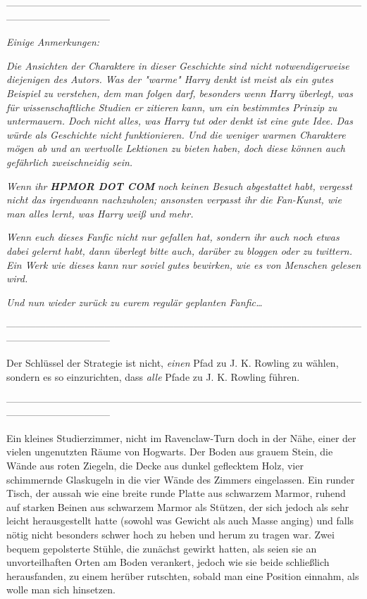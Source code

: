 {--------------------------------------------------------------------------------------------------------------------------------------------

\emph{\emph{Einige Anmerkungen:}}

\emph{Die Ansichten der Charaktere in dieser Geschichte sind nicht notwendigerweise diejenigen des Autors. Was der "warme" Harry denkt ist} \emph{\emph{meist}} \emph{als ein gutes Beispiel zu verstehen, dem man folgen darf, besonders wenn Harry überlegt, was für wissenschaftliche Studien er zitieren kann, um ein bestimmtes Prinzip zu untermauern. Doch nicht alles, was Harry tut oder denkt ist eine gute Idee. Das würde als Geschichte nicht funktionieren. Und die weniger warmen Charaktere mögen ab und an wertvolle Lektionen zu bieten haben, doch diese können auch gefährlich zweischneidig sein.}

\emph{Wenn ihr} \emph{\textbf{HPMOR DOT COM}} \emph{noch keinen Besuch abgestattet habt, vergesst nicht das irgendwann nachzuholen; ansonsten verpasst ihr die Fan-Kunst, wie man alles lernt, was Harry weiß und mehr.}

\emph{Wenn euch dieses Fanfic nicht nur gefallen hat, sondern ihr auch noch etwas dabei gelernt habt, dann überlegt bitte auch, darüber zu bloggen oder zu twittern. Ein Werk wie dieses kann nur soviel gutes bewirken, wie es von Menschen gelesen wird.}

\emph{\emph{Und nun wieder zurück zu eurem regulär geplanten Fanfic…}}

--------------------------------------------------------------------------------------------------------------------------------------------

Der Schlüssel der Strategie ist nicht, \emph{einen} Pfad zu J. K. Rowling zu wählen, sondern es so einzurichten, dass \emph{alle} Pfade zu J. K. Rowling führen.

--------------------------------------------------------------------------------------------------------------------------------------------

Ein kleines Studierzimmer, nicht im Ravenclaw-Turn doch in der Nähe, einer der vielen ungenutzten Räume von Hogwarts. Der Boden aus grauem Stein, die Wände aus roten Ziegeln, die Decke aus dunkel geflecktem Holz, vier schimmernde Glaskugeln in die vier Wände des Zimmers eingelassen. Ein runder Tisch, der aussah wie eine breite runde Platte aus schwarzem Marmor, ruhend auf starken Beinen aus schwarzem Marmor als Stützen, der sich jedoch als sehr leicht herausgestellt hatte (sowohl was Gewicht als auch Masse anging) und falls nötig nicht besonders schwer hoch zu heben und herum zu tragen war. Zwei bequem gepolsterte Stühle, die zunächst gewirkt hatten, als seien sie an unvorteilhaften Orten am Boden verankert, jedoch wie sie beide schließlich herausfanden, zu einem herüber rutschten, sobald man eine Position einnahm, als wolle man sich hinsetzen.

}
